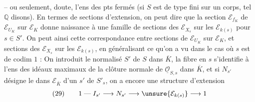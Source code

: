 -- ou seulement,  doute, l'ens des pts fermés (si $S$ est de type fini sur un corps, tel $\mathbb Q$ disons). En termes de sections d'extension, on peut dire que la section $\mathcal E_{f_K}$ de $\mathcal E_{U_K}$ sur $\mathcal E_K$ donne naissance à une famille de sections des $\mathcal E_{X_s}$ sur les $\mathcal E_{k(s)}$ pour $s\in S'$. On peut   ainsi cette correspondance entre sections de $\mathcal E_{U_K}$ sur $\mathcal E_K$, et sections des $\mathcal E_{X_s}$ sur les $\mathcal E_{k(s)}$, en généralisant ce qu'on a vu dans le cas où $s$ est de codim $1$ : On introduit le normalisé $S'$ de $S$ dans $\overline K$, la fibre en $s$ s'identifie à l'ens des idéaux maximaux de la clôture normale de $\underline{\mathcal O}_{S,s}$ dans $\overline K$, et si $N_{s'}$ désigne le   dans $\mathcal E_{\overline K}$ d'un $s'$ de $S'_s$, on a encore une structure d'extension
\[
(29)\qquad
1\mathrel{\text{---}}I_{s'}\longrightarrow N_{s'}\longrightarrow \unsure{\mathcal E_{k(s)}}\longrightarrow 1
\]
